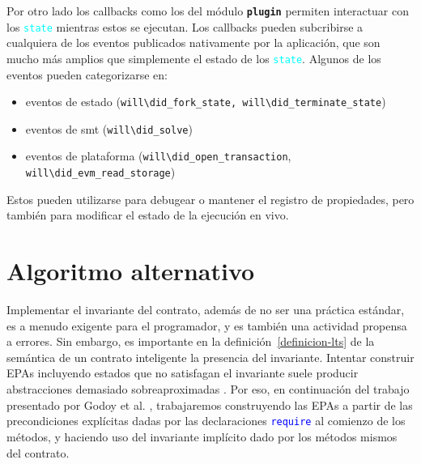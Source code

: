 Por otro lado los callbacks como los del módulo
\texttt{\textbf{plugin}} permiten interactuar con los \textcolor{cyan}{\texttt{state}} mientras estos se ejecutan.
Los callbacks pueden subcribirse a cualquiera de los eventos publicados nativamente por la aplicación, que son mucho más amplios que simplemente el estado de los \textcolor{cyan}{\texttt{state}}.
Algunos de los eventos pueden categorizarse en:
\begin{itemize}
    \item eventos de estado (\texttt{will\textbackslash did\_fork\_state, will\textbackslash did\_terminate\_state})
    \item eventos de smt (\texttt{will\textbackslash did\_solve})
    \item eventos de plataforma (\texttt{will\textbackslash did\_open\_transaction},\\ \texttt{will\textbackslash did\_evm\_read\_storage})
\end{itemize}
Estos pueden utilizarse para debugear o mantener el registro de propiedades, pero también para modificar el estado de la ejecución en vivo.



\section{Algoritmo alternativo}

Implementar el invariante del contrato, además de no ser una práctica estándar, es a menudo exigente para el programador, y es también una actividad propensa a errores.
Sin embargo, es importante en la definición~\ref{definicion-lts} de la semántica de un contrato inteligente la  presencia del invariante.
Intentar construir EPAs incluyendo estados que no satisfagan el invariante suele producir abstracciones demasiado sobreaproximadas \cite{de-caso-epa}.
Por eso, en continuación del trabajo presentado por Godoy et al. \cite{predicate-abstraction-for-smart-contract-validation}, trabajaremos construyendo las EPAs a partir de las precondiciones explícitas dadas por las declaraciones \textcolor{blue}{\texttt{require}} al comienzo de los métodos, y haciendo uso  del invariante implícito dado por los métodos mismos del contrato.

